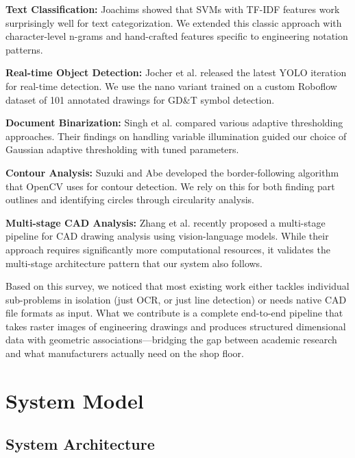 \documentclass[12pt,a4paper]{article}
\begin{document}
\textbf{Text Classification:} Joachims \cite{joachims1998} showed that SVMs with TF-IDF features work surprisingly well for text categorization. We extended this classic approach with character-level n-grams and hand-crafted features specific to engineering notation patterns.

\textbf{Real-time Object Detection:} Jocher et al. \cite{jocher2024yolo} released the latest YOLO iteration for real-time detection. We use the nano variant trained on a custom Roboflow dataset of 101 annotated drawings for GD\&T symbol detection.

\textbf{Document Binarization:} Singh et al. \cite{singh2024binarization} compared various adaptive thresholding approaches. Their findings on handling variable illumination guided our choice of Gaussian adaptive thresholding with tuned parameters.

\textbf{Contour Analysis:} Suzuki and Abe \cite{suzuki1985} developed the border-following algorithm that OpenCV uses for contour detection. We rely on this for both finding part outlines and identifying circles through circularity analysis.

\textbf{Multi-stage CAD Analysis:} Zhang et al. \cite{zhang2026blueprint} recently proposed a multi-stage pipeline for CAD drawing analysis using vision-language models. While their approach requires significantly more computational resources, it validates the multi-stage architecture pattern that our system also follows.

Based on this survey, we noticed that most existing work either tackles individual sub-problems in isolation (just OCR, or just line detection) or needs native CAD file formats as input. What we contribute is a complete end-to-end pipeline that takes raster images of engineering drawings and produces structured dimensional data with geometric associations---bridging the gap between academic research and what manufacturers actually need on the shop floor.

\section{System Model}

\subsection{System Architecture}
\end{document}
